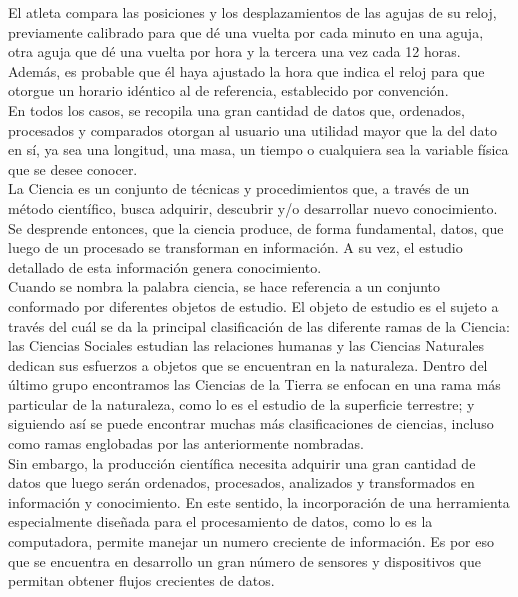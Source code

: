 El atleta compara las posiciones y los desplazamientos de las agujas de su reloj, previamente calibrado para que dé una vuelta por cada minuto en una aguja, otra aguja que dé una vuelta por hora y la tercera una vez cada 12 horas. Además, es probable que él haya ajustado la hora que indica el reloj para que otorgue un horario idéntico al de referencia, establecido por convención.\\

En todos los casos, se recopila una gran cantidad de datos que, ordenados, procesados y comparados otorgan al usuario una utilidad mayor que la del dato en sí, ya sea una longitud, una masa, un tiempo o cualquiera sea la variable física que se desee conocer.\\

La Ciencia es un conjunto de técnicas y procedimientos que, a través de un método científico, busca adquirir, descubrir y/o desarrollar nuevo conocimiento. Se desprende entonces, que la ciencia produce, de forma fundamental, datos, que luego de un procesado se transforman en información. A su vez, el estudio detallado de esta información genera conocimiento.\\

Cuando se nombra la palabra ciencia, se hace referencia a un conjunto conformado por diferentes objetos de estudio. El objeto de estudio es el sujeto a través del cuál se da la principal clasificación de las diferente ramas de la Ciencia: las Ciencias Sociales estudian las relaciones humanas y las Ciencias Naturales dedican sus esfuerzos a objetos que se encuentran en la naturaleza. Dentro del último grupo encontramos las Ciencias de la Tierra se enfocan en una rama más particular de la naturaleza, como lo es el estudio de la superficie terrestre; y siguiendo así se puede encontrar muchas más clasificaciones de ciencias, incluso como ramas englobadas por las anteriormente nombradas.\\

Sin embargo, la producción científica necesita adquirir una gran cantidad de datos que luego serán ordenados, procesados, analizados y transformados en información y conocimiento. En este sentido, la incorporación de una herramienta especialmente diseñada para el procesamiento de datos, como lo es la computadora, permite manejar un numero creciente de información. Es por eso que se encuentra en desarrollo un gran número de sensores y dispositivos que permitan obtener flujos crecientes de datos.\\

